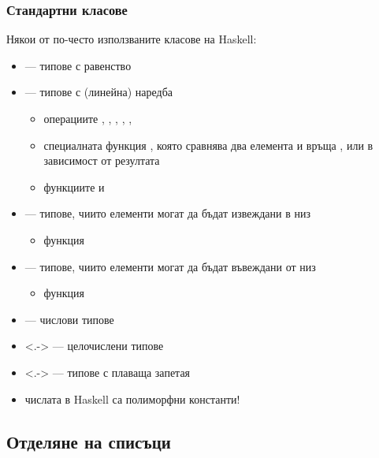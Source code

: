 \documentclass[alsotrans]{beamerswitch}
\begin{document}
\begin{frame}
  \frametitle{Стандартни класове}

  Някои от по-често използваните класове на Haskell:
  \begin{itemize}[<+->]
  \item {} --- типове с равенство
  \item {} --- типове с (линейна) наредба
    \begin{itemize}[<.->]
    \item операциите \lst{==}, \lst{/=}, \lst{>=}, \lst{<=}, \lst{<}, \lst{>}
    \item специалната функция , която сравнява два елемента и връща ,  или  в зависимост от резултата
    \item функциите  и 
    \end{itemize}
  \item {} --- типове, чиито елементи могат да бъдат извеждани в низ
    \begin{itemize}[<.->]
    \item функция 
    \end{itemize}
  \item {} --- типове, чиито елементи могат да бъдат въвеждани от низ
    \begin{itemize}[<.->]
    \item функция 
    \end{itemize}
  \item {} --- числови типове
  \item<.->  --- целочислени типове
  \item<.->  --- типове с плаваща запетая
  \item \alert{числата в Haskell са полиморфни константи!}
  \end{itemize}
\end{frame}

\subsection{Отделяне на списъци}
\end{document}
